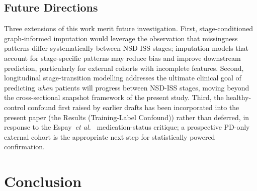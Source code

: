 \documentclass[10pt,letterpaper]{article}
\begin{document}
\subsection*{Future Directions}
Three extensions of this work merit future investigation. First, stage-conditioned graph-informed imputation would leverage the observation that missingness patterns differ systematically between NSD-ISS stages; imputation models that account for stage-specific patterns may reduce bias and improve downstream prediction, particularly for external cohorts with incomplete features. Second, longitudinal stage-transition modelling addresses the ultimate clinical goal of predicting \emph{when} patients will progress between NSD-ISS stages, moving beyond the cross-sectional snapshot framework of the present study. Third, the healthy-control confound first raised by earlier drafts has been incorporated into the present paper (the Results (Training-Label Confound)) rather than deferred, in response to the Espay~\textit{et al.}~\cite{espay2025med} medication-status critique; a prospective PD-only external cohort is the appropriate next step for statistically powered confirmation.

\section*{Conclusion}
\label{p1:sec:conclusion}
\end{document}
